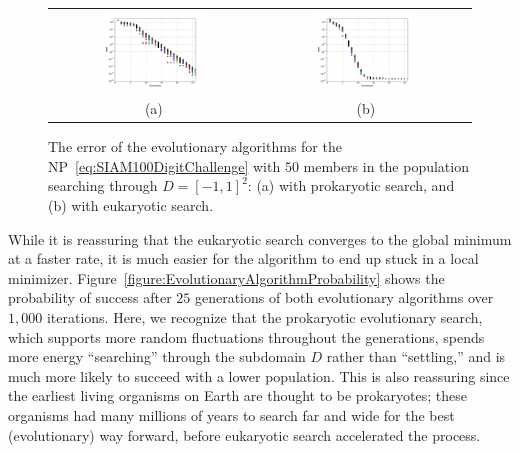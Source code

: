 \begin{figure}[htbp]
\begin{center}
\begin{tabular}{cc}
\hspace*{-0.5cm}\includegraphics[width=0.525\textwidth]{EvolutionaryAlgorithm1error}&
\hspace*{-0.5cm}\includegraphics[width=0.525\textwidth]{EvolutionaryAlgorithm2error}\\
(a) & (b)\\
\end{tabular}
\caption{The error of the evolutionary algorithms for the NP~\eqref{eq:SIAM100DigitChallenge} with $50$ members in the population searching through $D=[-1,1]^2$: (a) with prokaryotic search, and (b) with eukaryotic search.}
\label{figure:EvolutionaryAlgorithmError}
\end{center}
\end{figure}

While it is reassuring that the eukaryotic search converges to the global minimum at a faster rate, it is much easier for the algorithm to end up stuck in a local minimizer. Figure~\ref{figure:EvolutionaryAlgorithmProbability} shows the probability of success after $25$ generations of both evolutionary algorithms over $1,000$ iterations. Here, we recognize that the prokaryotic evolutionary search, which supports more random fluctuations throughout the generations, spends more energy ``searching'' through the subdomain $D$ rather than ``settling,'' and is much more likely to succeed with a lower population. This is also reassuring since the earliest living organisms on Earth are thought to be prokaryotes; these organisms had many millions of years to search far and wide for the best (evolutionary) way forward, before eukaryotic search accelerated the process.


